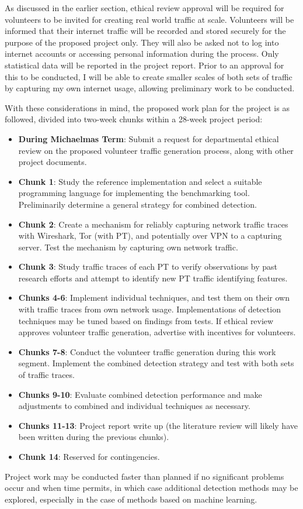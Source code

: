\documentclass[11pt]{article}
\begin{document}
As discussed in the earlier section, ethical review approval will be required for volunteers to be invited for creating real world traffic at scale. Volunteers will be informed that their internet traffic will be recorded and stored securely for the purpose of the proposed project only. They will also be asked not to log into internet accounts or accessing personal information during the process. Only statistical data will be reported in the project report. Prior to an approval for this to be conducted, I will be able to create smaller scales of both sets of traffic by capturing my own internet usage, allowing preliminary work to be conducted. 

With these considerations in mind, the proposed work plan for the project is as followed, divided into two-week chunks within a 28-week project period:

\begin{itemize}
	\item \textbf{During Michaelmas Term}: Submit a request for departmental ethical review on the proposed volunteer traffic generation process, along with other project documents.
	\item \textbf{Chunk 1}: Study the reference implementation and select a suitable programming language for implementing the benchmarking tool. Preliminarily determine a general strategy for combined detection.
	\item \textbf{Chunk 2}: Create a mechanism for reliably capturing network traffic traces with Wireshark, Tor (with PT), and potentially over VPN to a capturing server. Test the mechanism by capturing own network traffic.
	\item \textbf{Chunk 3}: Study traffic traces of each PT to verify observations by past research efforts and attempt to identify new PT traffic identifying features.
	\item \textbf{Chunks 4-6}: Implement individual techniques, and test them on their own with traffic traces from own network usage. Implementations of detection techniques may be tuned based on findings from tests.  If ethical review approves volunteer traffic generation, advertise with incentives for volunteers.
	\item \textbf{Chunks 7-8}: Conduct the volunteer traffic generation during this work segment. Implement the combined detection strategy and test with both sets of traffic traces. 
	\item \textbf{Chunks 9-10}: Evaluate combined detection performance and make adjustments to combined and individual techniques as necessary.
	\item \textbf{Chunks 11-13}: Project report write up (the literature review will likely have been written during the previous chunks).
	\item \textbf{Chunk 14}: Reserved for contingencies.
\end{itemize}

Project work may be conducted faster than planned if no significant problems occur and when time permits, in which case additional detection methods may be explored, especially in the case of methods based on machine learning.


\footnotesize{}
\end{document}
